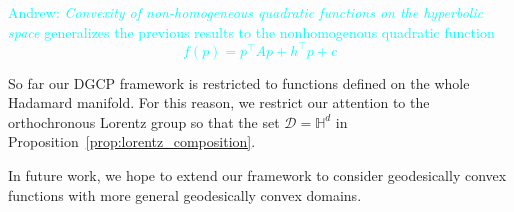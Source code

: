 \documentclass[twoside,11pt]{article}
\begin{document}
\textcolor{cyan}{Andrew: \emph{Convexity of non-homogeneous quadratic functions on the hyperbolic space} generalizes the previous results to the nonhomogenous quadratic function 
\[
f(p) = p^\top A p + h^\top p + c
\]}


 

\vskip 0.2in



\begin{remark}
    So far our DGCP framework is restricted to functions defined on the whole Hadamard manifold. For this reason, we restrict our attention to the orthochronous Lorentz group so that the set $\mathcal{D} = \mathbb{H}^d$ in Proposition~\ref{prop:lorentz_composition}. 
    
    In future work, we hope to extend our framework to consider geodesically convex functions with more general geodesically convex domains.
\end{remark}
\newpage
\end{document}
